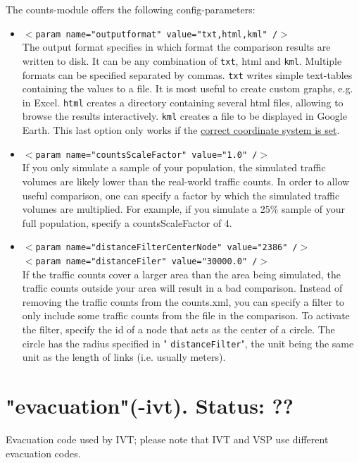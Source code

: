 The counts-module offers the following config-parameters:
\begin{itemize}
	\item 
\texttt{$<$param name="outputformat" value="txt,html,kml" /$>$}
\\     The output format specifies in which format the comparison results are written to disk. It can be any combination of 
\texttt{txt}, html and 
\texttt{kml}. Multiple formats can be specified separated by commas. 
\texttt{txt} writes simple text-tables containing the values to a file. It is most useful to create custom graphs, e.g. in Excel. 
\texttt{html} creates a directory containing several html files, allowing to browse the results interactively. 
\texttt{kml} creates a file to be displayed in Google Earth. This last option only works if the \href{http://www.matsim.org/node/405}{correct coordinate system is set}.
	\item 
\texttt{$<$param name="countsScaleFactor" value="1.0" /$>$}
\\     If you only simulate a sample of your population, the simulated  traffic volumes are likely lower than the real-world traffic counts. In  order to allow useful comparison, one can specify a factor by which the  simulated traffic volumes are multiplied. For example, if you simulate a  25\% sample of your full population, specify a countsScaleFactor  of 4.
	\item 
\texttt{$<$param name="distanceFilterCenterNode" value="2386" /$>$
\\     $<$param name="distanceFiler" value="30000.0" /$>$}
\\     If the traffic counts cover a larger area than the area being  simulated, the traffic counts outside your area will result in a bad  comparison. Instead of removing the traffic counts from the counts.xml,  you can specify a filter to only include some traffic counts from the  file in the comparison. To activate the filter, specify the id of a node  that acts as the center of a circle. The circle has the radius  specified in "
\texttt{distanceFilter}", the unit being the same unit as the length of links (i.e. usually meters).
\end{itemize}



\vfill\eject
\section{"evacuation"(-ivt). Status: ??}

Evacuation code used by IVT; please note that IVT and VSP use different evacuation codes.


